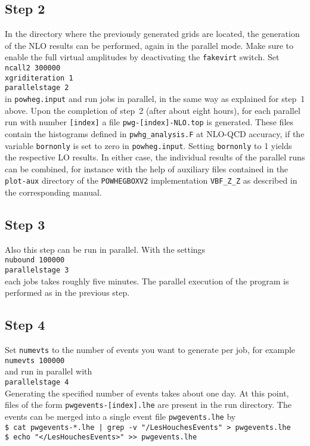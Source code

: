 \documentclass[a4paper,11pt]{article}
\newcommand\POWHEGBOXvTWO{{\tt POWHEG\;BOX\;V2}}
\begin{document}
\subsection*{Step 2}

In the directory where the previously generated grids are located,
the generation of the NLO results can be
performed, again in the parallel mode. Make sure to enable the full virtual amplitudes by deactivating the {\tt fakevirt} switch. 
Set
\\[2ex]
{\tt ncall2 300000}
\\
{\tt xgriditeration  1}
\\
{\tt parallelstage  2}
\\[2ex]
in {\tt powheg.input} and run jobs in parallel,
in the same way as explained for step~1 above.
%
Upon the completion of step~2 (after about eight hours),
for each parallel run with number {\tt [index]}
a file {\tt pwg-[index]-NLO.top}
is generated. These files contain the histograms defined in
{\tt pwhg\_analysis.F} at NLO-QCD accuracy,
if the variable {\tt bornonly} is set to zero in {\tt powheg.input}.
Setting {\tt bornonly} to 1 yields the respective LO results.
In either case, the individual results
of the parallel runs can be combined, for instance with the help
of auxiliary files contained in the {\tt plot-aux}
directory of the \POWHEGBOXvTWO{} implementation {\tt VBF\_Z\_Z}
as described in the corresponding manual.


\subsection*{Step 3}

Also this step can be run in parallel. 
With the settings
\\[2ex]
{\tt nubound 100000}
\\
{\tt parallelstage 3}
\\[2ex]
each jobs takes roughly five minutes.
The parallel execution of the program is
performed as in the previous step.


\subsection*{Step 4}

Set {\tt numevts} to the number of events you want to generate per
job, for example
\\[2ex]
{\tt numevts 100000}
\\[2ex]
and run in parallel with
\\[2ex]
{\tt parallelstage 4}
\\[2ex] 
Generating the specified number of
events takes about one day.
At this point, files of the form {\tt pwgevents-[index].lhe} are
present in the run directory.
The events can be merged into a single event file {\tt pwgevents.lhe} by
\\[2ex]
{\tt \$ cat pwgevents-*.lhe | grep -v "/LesHouchesEvents" >
  pwgevents.lhe}
\\
{\tt \$ echo "</LesHouchesEvents>" >> pwgevents.lhe}
\end{document}
